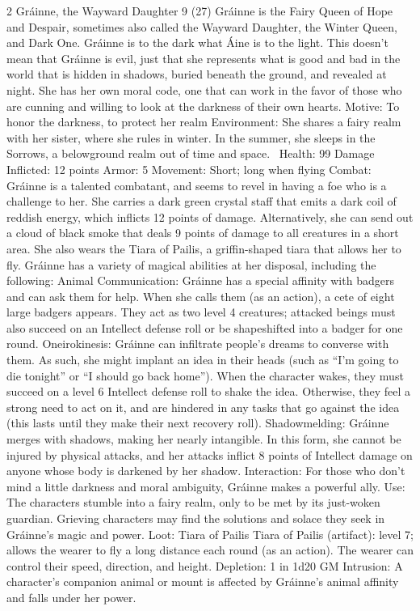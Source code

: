 \begin{multicols}{2}
Gráinne, the Wayward Daughter 9 (27)
Gráinne is the Fairy Queen of Hope and Despair, sometimes also called the Wayward Daughter, the Winter Queen, and Dark One. Gráinne is to the dark what Áine is to the light. This doesn’t mean that Gráinne is evil, just that she represents what is good and bad in the world that is hidden in shadows, buried beneath the ground, and revealed at night. She has her own moral code, one that can work in the favor of those who are cunning and willing to look at the darkness of their own hearts.
Motive: To honor the darkness, to protect her realm
Environment: She shares a fairy realm with her sister, where she rules in winter. In the summer, she sleeps in the Sorrows, a belowground realm out of time and space. 
Health: 99
Damage Inflicted: 12 points
Armor: 5
Movement: Short; long when flying
Combat: Gráinne is a talented combatant, and seems to revel in having a foe who is a
challenge to her. She carries a dark green crystal staff that emits a dark coil of reddish energy, which inflicts 12 points of damage. Alternatively, she can send out a cloud of black smoke that deals 9 points of damage to all creatures in a short area. She also wears the Tiara of Pailis, a griffin-shaped tiara that allows her to fly. Gráinne has a variety of magical abilities at her disposal, including the following:
Animal Communication: Gráinne has a special affinity with badgers and can ask them for help. When she calls them (as an action), a cete of eight large badgers appears. They act as two level 4 creatures; attacked beings must also succeed on an Intellect defense roll or be shapeshifted into a badger for one round.
Oneirokinesis: Gráinne can infiltrate people’s dreams to converse with them. As such, she might implant an idea in their heads (such as “I’m going to die tonight” or “I should go back home”). When the character wakes, they must succeed on a level 6 Intellect defense roll to shake the idea. Otherwise, they feel a strong need to act on it, and are hindered in any tasks that go against the idea (this lasts until they make their next recovery roll).
Shadowmelding: Gráinne merges with shadows, making her nearly
intangible. In this form, she cannot be injured by physical attacks, and her attacks inflict 8 points of Intellect damage on anyone whose body is darkened by her shadow.
Interaction: For those who don’t mind a little darkness and moral ambiguity, Gráinne makes a powerful ally.
Use: The characters stumble into a fairy realm, only to be met by its just-woken guardian. Grieving characters may find the solutions and solace they seek in Gráinne’s magic and power.
Loot: Tiara of Pailis
	Tiara of Pailis (artifact): level 7; allows the wearer to fly a long distance each round (as an action). The wearer can control their speed, direction, and height. Depletion: 1 in 1d20
GM Intrusion: A character’s companion animal or mount is affected by Gráinne’s animal affinity and falls under her power.


\end{multicols}
